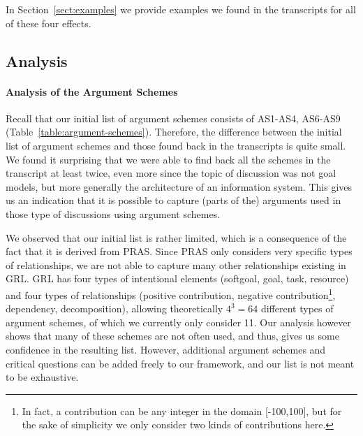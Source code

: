 In Section~\ref{sect:examples} we provide examples we found in the transcripts for all of these four effects.

\subsection{Analysis}
\label{sect:gmas:transcripts:analysis}

\paragraph{Analysis of the Argument Schemes}
Recall that our initial list of argument schemes consists of AS1-AS4, AS6-AS9 (Table~\ref{table:argument-schemes}). Therefore, the difference between the initial list of argument schemes and those found back in the transcripts is quite small. We found it surprising that we were able to find back all the schemes in the transcript at least twice, even more since the topic of discussion was not goal models, but more generally the architecture of an information system. This gives us an indication that it is possible to capture (parts of the) arguments used in those type of discussions using argument schemes.

We observed that our initial list is rather limited, which is a consequence of the fact that it is derived from PRAS. Since PRAS only considers very specific types of relationships, we are not able to capture many other relationships existing in GRL. GRL has four types of intentional elements (softgoal, goal, task, resource) and four types of relationships (positive contribution, negative contribution\footnote{In fact, a contribution can be any integer in the domain [-100,100], but for the sake of simplicity we only consider two kinds of contributions here.}, dependency, decomposition), allowing theoretically $4^3=64$ different types of argument schemes, of which we currently only consider 11. Our analysis however shows that many of these schemes are not often used, and thus, gives us some confidence in the resulting list. However, additional argument schemes and critical questions can be added freely to our framework, and our list is not meant to be exhaustive.

